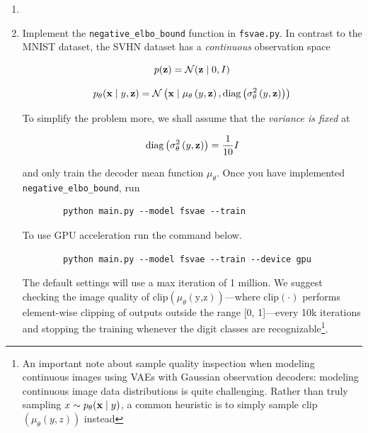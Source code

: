 \begin{enumerate}[label=(\alph*)]
    \item 

    \item {} Implement the \texttt{negative\_elbo\_bound} function in \texttt{fsvae.py}. In contrast to the MNIST dataset, 
    the SVHN dataset has a \textit{continuous} observation space

    \begin{equation} \label{eq:31}
        p(\mathbf{z}) = \mathcal{N}(\mathbf{z} \mid 0, I)
    \end{equation}

    \begin{equation} \label{eq:32}
        p_{\theta}(\mathbf{x} \mid y, \mathbf{z}) = \mathcal{N}\left(\mathbf{x} \mid \mu_{\theta}\left(y,\mathbf{z}\right), \text{diag}\left(\sigma_{\theta}^2\left(y, \mathbf{z}\right)\right)\right)
    \end{equation}

    To simplify the problem more, we shall assume that the \textit{variance is fixed} at

    \begin{equation} \label{eq:33}
       \text{diag}\left(\sigma_{\theta}^2\left(y, \mathbf{z}\right)\right) = \frac{1}{10}I
    \end{equation}

    and only train the decoder mean function $\mu_{\theta}$. Once you have implemented \texttt{negative\_elbo\_bound}, run
    \begin{verbatim}
        python main.py --model fsvae --train 
    \end{verbatim}

    To use GPU acceleration run the command below. 
    \begin{verbatim}
        python main.py --model fsvae --train --device gpu
    \end{verbatim}

    The default settings will use a max iteration of 1 million. We suggest checking the image quality of 
    $\text{clip}\left(\mu_{\theta}\left(\text{y,z}\right)\right)$—where $\text{clip}(\cdot)$ performs element-wise clipping of 
    outputs outside the range [0, 1]—every 10k iterations and stopping the training whenever the digit classes are recognizable\footnote{An important note about sample quality inspection when modeling continuous images using VAEs with Gaussian observation decoders: modeling continuous image data distributions is quite challenging. Rather than truly sampling $x \sim p_{\theta}(\mathbf{x} \mid y)$, a common heuristic is to simply sample clip$(\mu_{\theta}(y,z))$ instead}.


\end{enumerate}
